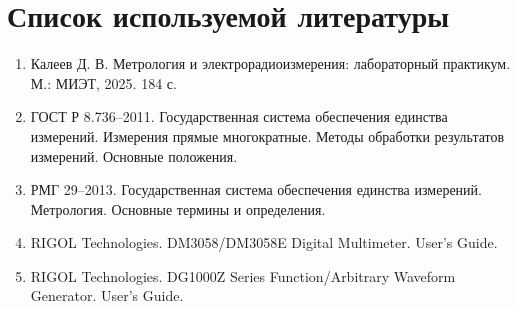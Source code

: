 \documentclass[12pt,a4paper]{article}
\begin{document}

\section{Список используемой литературы}

\begin{enumerate}
  \item Калеев Д. В. Метрология и электрорадиоизмерения: лабораторный практикум. М.: МИЭТ, 2025. 184 с.
  \item ГОСТ Р 8.736--2011. Государственная система обеспечения единства измерений. Измерения прямые многократные. Методы обработки результатов измерений. Основные положения.
  \item РМГ 29--2013. Государственная система обеспечения единства измерений. Метрология. Основные термины и определения.
  \item RIGOL Technologies. DM3058/DM3058E Digital Multimeter. User's Guide.
  \item RIGOL Technologies. DG1000Z Series Function/Arbitrary Waveform Generator. User's Guide.
\end{enumerate}
\end{document}
